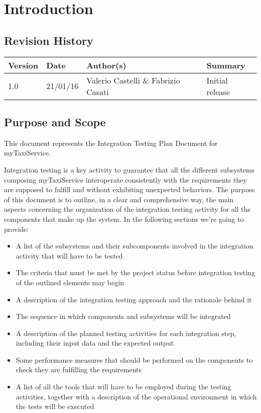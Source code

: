 \chapter{Introduction}
\section{Revision History}
\begin{center}
\begin{longtable}{|l|l|l|l|}
\hline
Version &
Date &
Author(s) &
Summary \\
\hline
1.0 &
21/01/16 &
Valerio Castelli \& Fabrizio Casati &
Initial release \\
\hline
\end{longtable}
\end{center}

\section{Purpose and Scope}
This document represents the Integration Testing Plan Document for myTaxiService. 

Integration testing is a key activity to guarantee that all the different subsystems composing myTaxiService interoperate consistently with the requirements they are supposed to fulfill and without exhibiting unexpected behaviors. 
The purpose of this document is to outline, in a clear and comprehensive way, the main aspects concerning the organization of the integration testing activity for all the components that make up the system.
In the following sections we're going to provide:
\begin{itemize}
	\item A list of the subsystems and their subcomponents involved in the integration activity that will have to be tested
	\item The criteria that must be met by the project status before integration testing of the outlined elements may begin 
	\item A description of the integration testing approach and the rationale behind it
	\item The sequence in which components and subsystems will be integrated 
	\item A description of the planned testing activities for each integration step, including their input data and the expected output 
	\item Some performance measures that should be performed on the components to check they are fulfilling the requirements
	\item A list of all the tools that will have to be employed during the testing activities, together with a description of the operational environment in which the tests will be executed
\end{itemize}
